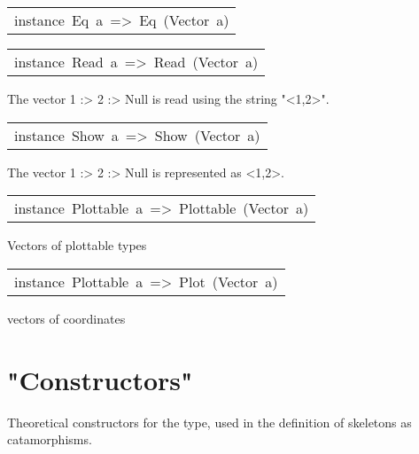 \begin{haddockdesc}
\item[\begin{tabular}{@{}l}
instance\ Eq\ a\ =>\ Eq\ (Vector\ a)
\end{tabular}]
\end{haddockdesc}
\begin{haddockdesc}
\item[\begin{tabular}{@{}l}
instance\ Read\ a\ =>\ Read\ (Vector\ a)
\end{tabular}]\haddockbegindoc
The vector 1 :> 2 :> Null is read using the string "<1,2>".\par

\end{haddockdesc}
\begin{haddockdesc}
\item[\begin{tabular}{@{}l}
instance\ Show\ a\ =>\ Show\ (Vector\ a)
\end{tabular}]\haddockbegindoc
The vector 1 :> 2 :> Null is represented as <1,2>.\par

\end{haddockdesc}
\begin{haddockdesc}
\item[\begin{tabular}{@{}l}
instance\ Plottable\ a\ =>\ Plottable\ (Vector\ a)
\end{tabular}]\haddockbegindoc
Vectors of plottable types\par

\end{haddockdesc}
\begin{haddockdesc}
\item[\begin{tabular}{@{}l}
instance\ Plottable\ a\ =>\ Plot\ (Vector\ a)
\end{tabular}]\haddockbegindoc
vectors of coordinates\par

\end{haddockdesc}
\section{"Constructors"}
Theoretical constructors for the  type, used in the
 definition of skeletons as catamorphisms.\par


